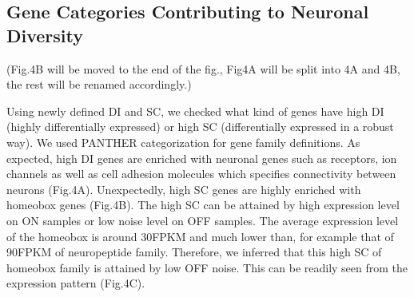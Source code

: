 \subsection{Gene Categories Contributing to Neuronal Diversity}

(Fig.4B will be moved to the end of the fig., Fig4A will be split into 4A and 4B, the rest will be renamed accordingly.)

Using newly defined DI and SC, we checked what kind of genes have high DI (highly differentially expressed) or high SC (differentially expressed in a robust way). We used PANTHER categorization for gene family definitions. As expected, high DI genes are enriched with neuronal genes such as receptors, ion channels as well as cell adhesion molecules which specifies connectivity between neurons (Fig.4A). Unexpectedly, high SC genes are highly enriched with homeobox genes (Fig.4B). The high SC can be attained by high expression level on ON samples or low noise level on OFF samples. The average expression level of the homeobox is around 30FPKM and much lower than, for example that of 90FPKM of neuropeptide family. Therefore, we inferred that this high SC of homeobox family is attained by low OFF noise. This can be readily seen from the expression pattern (Fig.4C). 


